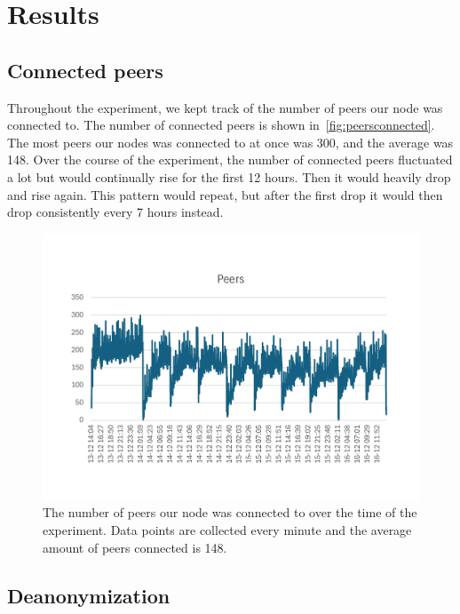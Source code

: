 \section{Results}\label{sec:results}

\subsection{Connected peers}\label{subsec:connected-peers}
Throughout the experiment, we kept track of the number of peers our node was connected to.
The number of connected peers is shown in~\autoref{fig:peersconnected}.
The most peers our nodes was connected to at once was 300, and the average was 148.
Over the course of the experiment, the number of connected peers fluctuated a lot but would continually rise for the first 12 hours.
Then it would heavily drop and rise again.
This pattern would repeat, but after the first drop it would then drop consistently every 7 hours instead.

\begin{figure}[!ht]
    \includegraphics[width=\linewidth]{figures/conPeer2}
    \caption{The number of peers our node was connected to over the time of the experiment.
    Data points are collected every minute and the average amount of peers connected is 148.}
    \label{fig:peersconnected}
\end{figure}

\subsection{Deanonymization}\label{subsec:deanonymization}


